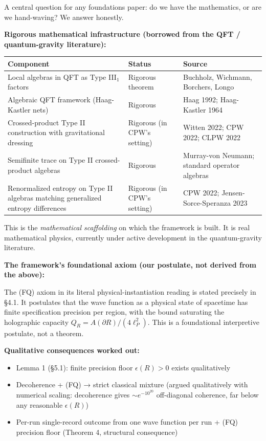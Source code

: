 \documentclass[11pt,a4paper]{article}
\begin{document}
A central question for any foundations paper: do we have the mathematics, or are we hand-waving? We answer honestly.

\textbf{Rigorous mathematical infrastructure (borrowed from the QFT / quantum-gravity literature):}

\begin{center}
\small
\begin{tabularx}{\linewidth}{|Y|Y|Y|}
\hline
\textbf{Component} & \textbf{Status} & \textbf{Source} \\
\hline
Local algebras in QFT as Type III$_1$ factors & Rigorous theorem & Buchholz, Wichmann, Borchers, Longo \\
\hline
Algebraic QFT framework (Haag-Kastler nets) & Rigorous & Haag 1992; Haag-Kastler 1964 \\
\hline
Crossed-product Type II construction with gravitational dressing & Rigorous (in CPW's setting) & Witten 2022; CPW 2022; CLPW 2022 \\
\hline
Semifinite trace on Type II crossed-product algebras & Rigorous & Murray-von Neumann; standard operator algebras \\
\hline
Renormalized entropy on Type II algebras matching generalized entropy differences & Rigorous (in CPW's setting) & CPW 2022; Jensen-Sorce-Speranza 2023 \\
\hline
\end{tabularx}
\end{center}

This is the \emph{mathematical scaffolding} on which the framework is built. It is real mathematical physics, currently under active development in the quantum-gravity literature.

\textbf{The framework's foundational axiom (our postulate, not derived from the above):}

The (FQ) axiom in its literal physical-instantiation reading is stated precisely in §4.1. It postulates that the wave function as a physical state of spacetime has finite specification precision per region, with the bound saturating the holographic capacity $Q_R = A(\partial R)/(4\ell_P^2)$. This is a foundational interpretive postulate, not a theorem.

\textbf{Qualitative consequences worked out:}

\begin{itemize}
  \item Lemma 1 (§5.1): finite precision floor $\epsilon(R) > 0$ exists qualitatively
  \item Decoherence + (FQ) → strict classical mixture (argued qualitatively with numerical scaling: decoherence gives $\sim e^{-10^{20}}$ off-diagonal coherence, far below any reasonable $\epsilon(R)$)
  \item Per-run single-record outcome from one wave function per run + (FQ) precision floor (Theorem 4, structural consequence)
\end{itemize}
\end{document}
